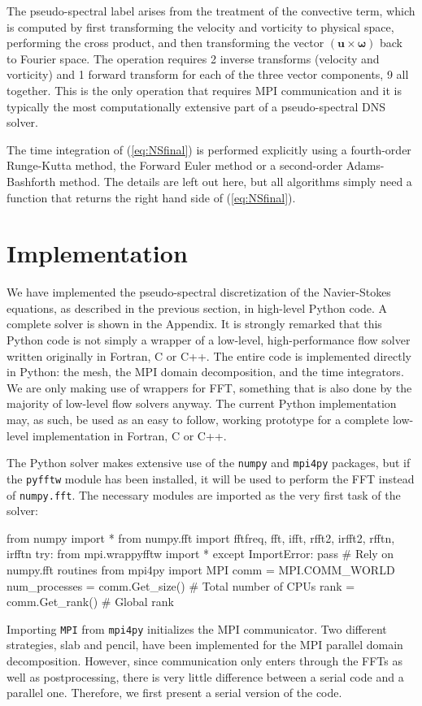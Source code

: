 \documentclass[11pt, oneside]{article}
\begin{document}
The pseudo-spectral label arises from the treatment of the convective term, which is computed by first transforming the velocity and vorticity to physical space, performing the cross product, and then transforming the vector ${(\bm{u}  \times  \bm{\omega})}$  back to Fourier space. The operation requires 2 inverse transforms (velocity and vorticity) and 1 forward transform for each of the three vector components, 9 all together. This is the only operation that requires MPI communication and it is typically the most computationally extensive part of a pseudo-spectral DNS solver.

The time integration of (\ref{eq:NSfinal}) is performed explicitly using a fourth-order Runge-Kutta method, the Forward Euler method or a second-order Adams-Bashforth method. The details are left out here, but all algorithms simply need a function that returns the right hand side of (\ref{eq:NSfinal}).

\section{Implementation}

We have implemented the pseudo-spectral discretization of the Navier-Stokes equations, as described in the previous section, in high-level Python code. A complete solver is shown in the Appendix. It is strongly remarked that this Python code is not simply a wrapper of a low-level, high-performance flow solver written originally in Fortran, C or C++. The entire code is implemented directly in Python: the mesh, the MPI domain decomposition, and the time integrators. We are only making use of wrappers for FFT, something that is also done by the majority of low-level flow solvers anyway. The current Python implementation may, as such, be used as an easy to follow, working prototype for a complete low-level implementation in Fortran, C or C++.

The Python solver makes extensive use of the \texttt{numpy} and \texttt{mpi4py} packages, but if the \texttt{pyfftw} module has been installed, it will be used to perform the FFT instead of \texttt{numpy.fft}. The necessary modules are imported as the very first task of the solver:

\begin{python}
from numpy import *
from numpy.fft import fftfreq, fft, ifft, rfft2, irfft2, rfftn, irfftn
try:
    from mpi.wrappyfftw import *
except ImportError:
    pass # Rely on numpy.fft routines
from mpi4py import MPI
comm = MPI.COMM_WORLD
num_processes = comm.Get_size() # Total number of CPUs
rank = comm.Get_rank()          # Global rank
\end{python}
Importing \texttt{MPI} from \texttt{mpi4py} initializes the MPI communicator. Two different strategies, slab and pencil, have been implemented for the MPI parallel domain decomposition. However, since communication only enters through the FFTs as well as postprocessing, there is very little difference between a serial code and a parallel one. Therefore, we first present a serial version of the code.
\end{document}
